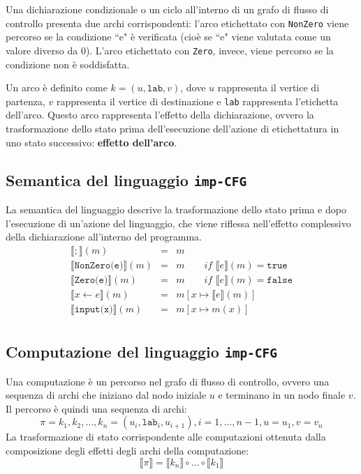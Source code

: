 Una dichiarazione condizionale o un ciclo all'interno di un grafo di flusso di controllo
presenta due archi corrispondenti: l'arco etichettato con \texttt{NonZero} viene percorso se
la condizione ``e" è verificata (cioè se ``e" viene valutata come un valore diverso da $0$).
L'arco etichettato con \texttt{Zero}, invece, viene percorso se la condizione non è soddisfatta.

Un arco è definito come $k=(u,\texttt{lab},v)$, dove $u$ rappresenta il vertice di partenza,
$v$ rappresenta il vertice di destinazione e \texttt{lab} rappresenta l'etichetta dell'arco.
Questo arco rappresenta l'effetto della dichiarazione, ovvero la trasformazione dello stato prima
dell'esecuzione dell'azione di etichettatura in uno stato successivo: \textbf{effetto dell'arco}.
\subsection{Semantica del linguaggio \texttt{imp-CFG}}
La semantica del linguaggio descrive la trasformazione dello stato prima e dopo l'esecuzione di
un'azione del linguaggio, che viene riflessa nell'effetto complessivo della dichiarazione all'interno
del programma.
\[
\begin{array}{lcl}
  \llbracket ; \rrbracket(m) & = & m \\
  \llbracket \texttt{NonZero(e)} \rrbracket(m) & = & m \qquad \textit{if } \llbracket e \rrbracket(m) = \texttt{true} \\
  \llbracket \texttt{Zero(e)} \rrbracket(m) & = & m \qquad \textit{if } \llbracket e \rrbracket(m) = \texttt{false} \\
  \llbracket x \leftarrow e \rrbracket(m) & = & m[x \mapsto \llbracket e \rrbracket(m)] \\
  \llbracket \texttt{input(x)} \rrbracket(m) & = & m[x \mapsto m(x)] \\
\end{array}
\] 
\subsection{Computazione del linguaggio \texttt{imp-CFG}}
Una computazione è un percorso nel grafo di flusso di controllo, ovvero una sequenza di archi
che iniziano dal nodo iniziale $u$ e terminano in un nodo finale $v$. Il percorso è quindi 
una sequenza di archi:
\[
  \pi = k_1, k_2, \dots, k_n = (u_i, \texttt{lab}_i, u_{i+1}), i = 1, \dots, n - 1, u = u_1, v = v_n
\]
La trasformazione di stato corrispondente alle computazioni ottenuta dalla
composizione degli effetti degli archi della computazione:
\[
  \llbracket \pi \rrbracket = \llbracket k_n \rrbracket \circ \dots \circ \llbracket k_1 \rrbracket
\]
